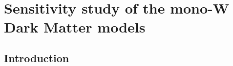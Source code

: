 


% 
% 

\chapter{Sensitivity study of the mono-W Dark Matter models}
\label{chap:monoW}




\section{Introduction}

